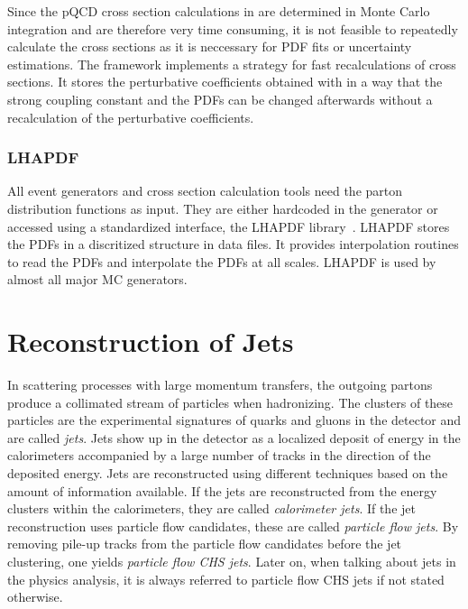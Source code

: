 Since the pQCD cross section calculations in \NLOJETPP are determined in Monte
Carlo integration and are therefore very time consuming, it is not feasible to
repeatedly calculate the cross sections as it is neccessary for PDF fits or
uncertainty estimations. The \fastNLO framework implements a strategy for fast
recalculations of cross sections. It stores the perturbative coefficients
obtained with \NLOJETPP in a way that the strong coupling constant and the PDFs
can be changed afterwards without a recalculation of the perturbative
coefficients.

\subsubsection{LHAPDF}

All event generators and cross section calculation tools need the parton
distribution functions as input. They are either hardcoded in the generator or
accessed using a standardized interface, the LHAPDF
library~\cite{Whalley:2005nh,Buckley:2014ana}. LHAPDF stores the PDFs in a discritized
structure in data files. It provides interpolation routines to read the PDFs and
interpolate the PDFs at all scales. LHAPDF is used by almost all major MC
generators.


\section{Reconstruction of Jets}
\label{sec:jet_reconstruction}

In scattering processes with large momentum transfers, the outgoing partons
produce a collimated stream of particles when hadronizing. The clusters of these
particles are the experimental signatures of quarks and gluons in the detector
and are called \emph{jets}. Jets show up in the \CMS detector as a localized
deposit of energy in the calorimeters accompanied by a large number of tracks in
the direction of the deposited energy. Jets are reconstructed using different
techniques based on the amount of information available. If the jets are
reconstructed from the energy clusters within the calorimeters, they are called
\emph{calorimeter jets}. If the jet reconstruction uses particle flow
candidates, these are called \emph{particle flow jets}. By removing pile-up
tracks from the particle flow candidates before the jet clustering, one yields
\emph{particle flow CHS jets}. Later on, when talking about jets in the physics
analysis, it is always referred to particle flow CHS jets if not stated otherwise.

